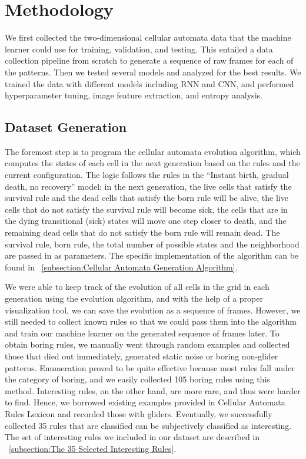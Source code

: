 \documentclass[12pt]{article}
\numberwithin{figure}{section} %
\begin{document}
\newpage
\section{Methodology}
\label{Methodology}
We first collected the two-dimensional cellular automata data that the machine learner could use for training, validation, and testing. This entailed a data collection pipeline from scratch to generate a sequence of raw frames for each of the patterns. Then we tested several models and analyzed for the best results. We trained the data with different models including RNN and CNN, and performed hyperparameter tuning, image feature extraction, and entropy analysis. 

\subsection{Dataset Generation}
The foremost step is to program the cellular automata evolution algorithm, which computes the states of each cell in the next generation based on the rules and the current configuration. The logic follows the rules in the “Instant birth, gradual death, no recovery” model: in the next generation, the live cells that satisfy the survival rule and the dead cells that satisfy the born rule will be alive, the live cells that do not satisfy the survival rule will become sick, the cells that are in the dying transitional (sick) states will move one step closer to death, and the remaining dead cells that do not satisfy the born rule will remain dead. The survival rule, born rule, the total number of possible states and the neighborhood are passed in as parameters. The specific implementation of the algorithm can be found in ~\ref{subsection:Cellular Automata Generation Algorithm}. 

We were able to keep track of the evolution of all cells in the grid in each generation using the evolution algorithm, and with the help of a proper visualization tool, we can save the evolution as a sequence of frames. However, we still needed to collect known rules so that we could pass them into the algorithm and train our machine learner on the generated sequence of frames later. To obtain boring rules, we manually went through random examples and collected those that died out immediately, generated static noise or boring non-glider patterns. Enumeration proved to be quite effective because most rules fall under the category of boring, and we easily collected 105 boring rules using this method. Interesting rules, on the other hand, are more rare, and thus were harder to find. Hence, we borrowed existing examples provided in Cellular Automata Rules Lexicon and recorded those with gliders. Eventually, we successfully collected 35 rules that are classified can be subjectively classified as interesting. The set of interesting rules we included in our dataset are described in ~\ref{subsection:The 35 Selected Interesting Rules}. 
\end{document}

